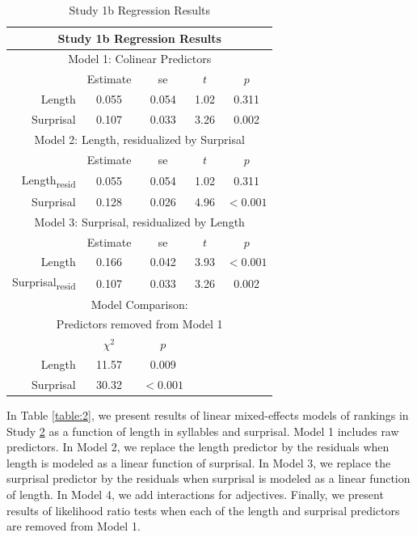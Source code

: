 \begin{appendices}
\begin{table}[h]
\center
\footnotesize
\begin{tabular}{r|cccc}
\hline
\hline
\multicolumn{5}{c}{\textbf{Study 1b Regression Results}} \\
\hline
\hline
\multicolumn{5}{c}{Model 1: Colinear Predictors} \\
& Estimate & se & $t$ & $p$ \\
\hline
Length & 0.055 & 0.054 & 1.02 & 0.311 \\
Surprisal & 0.107 & 0.033 & 3.26 & 0.002 \\
\hline
\hline
\multicolumn{5}{c}{Model 2: Length, residualized by Surprisal} \\
& Estimate & se & $t$ & $p$ \\
\hline
Length\textsubscript{resid} & 0.055 & 0.054 & 1.02 & 0.311 \\
Surprisal & 0.128 & 0.026 & 4.96 & $<0.001$ \\
\hline
\hline
\multicolumn{5}{c}{Model 3: Surprisal, residualized by Length} \\
& Estimate & se & $t$ & $p$ \\
\hline
Length & 0.166 & 0.042 & 3.93 & $<0.001$ \\
Surprisal\textsubscript{resid} & 0.107 & 0.033 & 3.26 & 0.002 \\
\hline
\hline
\multicolumn{5}{c}{Model Comparison:} \\
\multicolumn{5}{c}{Predictors removed from Model 1} \\
& $\chi^2$ & $p$ \\
\hline
Length & 11.57 & 0.009 \\
Surprisal & 30.32 & $<0.001$ \\
\hline
\hline
\end{tabular}
\caption{Study 1b Regression Results}
\label{table:1b}
\end{table}




In Table \ref{table:2}, we present results of linear mixed-effects models of rankings in Study \hyperref[sec:study2]{2} as a function of length in syllables and surprisal.
Model 1 includes raw predictors.
In Model 2, we replace the length predictor by the residuals when length is modeled as a linear function of surprisal.
In Model 3, we replace the surprisal predictor by the residuals when surprisal is modeled as a linear function of length.
In Model 4, we add interactions for adjectives.
Finally, we present results of likelihood ratio tests when each of the length and surprisal predictors are removed from Model 1.


\end{appendices}
